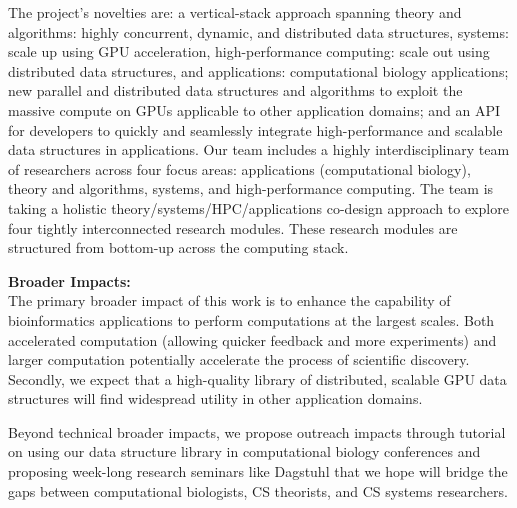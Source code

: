 The project’s novelties are: a vertical-stack approach spanning theory and algorithms: highly concurrent, dynamic, and distributed data structures, systems: scale up using GPU acceleration, high-performance computing: scale out using distributed data structures, and applications: computational biology applications; new parallel and distributed data structures and algorithms to exploit the massive compute on GPUs applicable to other application domains; and an API for developers to quickly and seamlessly integrate high-performance and scalable data structures in applications.
%
Our team includes a highly interdisciplinary team of researchers across four focus areas: applications (computational biology), theory and algorithms, systems, and high-performance computing. The team is taking a holistic theory/systems/HPC/applications co-design approach to explore four tightly interconnected research modules. These research modules are structured from bottom-up across the computing stack.

\noindent \textbf{\large Broader Impacts: }\\
The primary broader impact of this work is to enhance the capability of bioinformatics applications to perform computations at the largest scales. Both accelerated computation (allowing quicker feedback and more experiments) and larger computation potentially accelerate the process of scientific discovery. Secondly, we expect that a high-quality library of distributed, scalable GPU data structures will find widespread utility in other application domains.

Beyond technical broader impacts, we propose outreach impacts through tutorial on using our data structure library in computational biology conferences and proposing week-long research seminars like Dagstuhl that we hope will bridge the gaps between computational biologists, CS theorists, and CS systems researchers.
